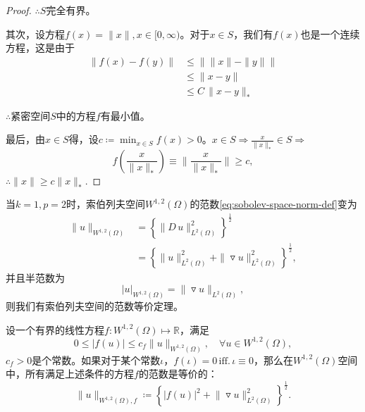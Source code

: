 \begin{proof}
$\therefore S$完全有界。

其次，设方程$f(x)=\|x\|, x \in [0,\infty)$。对于$x \in S$，我们有$f(x)$也是一个连续方程，这是由于
\begin{equation*}
  \begin{split}
    \big\| f(x) - f(y) \big\| & \le \big\| \|x\| - \|y\| \big\|\\
    & \le \big\| x  - y \big\|\\
    & \le C \, \big\| x - y \big\|_{*}
    \end{split}
\end{equation*}

$\therefore$紧密空间$S$中的方程$f$有最小值。

最后，由$x \in S$得，设$c \coloneqq \min_{x \in S} f(x) > 0$。$x \in S \Rightarrow \frac{x}{\| x \|_{*}} \in S \Rightarrow$
\begin{equation*}
  f \left( \frac{x}{\| x \|_{*}} \right) \equiv \Big\| \frac{x}{\| x \|_{*}} \Big\| \ge c,
\end{equation*}
$\therefore \|x \| \ge c \|x\|_{*}.$
\end{proof}

当$k=1,p=2$时，索伯列夫空间$W^{1,2}(\Omega)$的范数\eqref{eq:sobolev-space-norm-def}变为
\begin{equation*}
\begin{split}
  \| u \|_{W^{1,2}(\Omega)}
  &= \left\{ \big\| D \, u \big\|_{L^{2}(\Omega)}^2 \right\}^{\frac{1}{2}}\\
  &= \left\{
  \|u\|_{L^{2}(\Omega)}^2 + \| \triangledown u \|_{L^{2}(\Omega)}^2
  \right\}^{\frac{1}{2}},
\end{split}
\end{equation*}
并且半范数为
\begin{equation*}
  \left| u \right|_{W^{1,2}(\Omega)} = \| \triangledown u \|_{L^{2}(\Omega)},
\end{equation*}
则我们有索伯列夫空间的范数等价定理。

\begin{theorem}[索伯列夫空间的范数等价定理]
  \label{theorem:sobolev-equivalence-norm-theorem}
  设一个有界的线性方程$f:W^{1,2}(\Omega) \mapsto \mathbb{R}$，满足
  \begin{equation*}
    0 \le \left| f(u) \right| \le c_f \big\| u \big\|_{W^{1,2}(\Omega)}, \quad \forall u \in W^{1,2}(\Omega),
  \end{equation*}
$c_f >0$是个常数。如果对于某个常数$\iota$，$f(\iota) = 0 \, \text{iff.} \, \iota \equiv 0$，那么在$W^{1,2}(\Omega)$空间中，所有满足上述条件的方程$f$的范数是等价的：
\begin{equation}
  \label{eq:sobolev-norm-equivalence-theorem}
  \big\| u \big\|_{W^{1,2}(\Omega), f} \coloneqq \left\{ \left| f(u) \right|^2 + \big\| \triangledown u \big\|_{L^{2}(\Omega)}^2 \right\}^{\frac{1}{2}}.
\end{equation}
\end{theorem}

